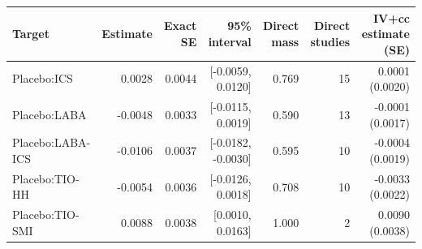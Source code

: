 \begin{tabular}{lrrrrrr}
\toprule
Target & Estimate & Exact SE & 95\% interval & Direct mass & Direct studies & IV+cc estimate (SE) \\
\midrule
Placebo:ICS & 0.0028 & 0.0044 & [-0.0059, 0.0120] & 0.769 & 15 & 0.0001 (0.0020) \\
Placebo:LABA & -0.0048 & 0.0033 & [-0.0115, 0.0019] & 0.590 & 13 & -0.0001 (0.0017) \\
Placebo:LABA-ICS & -0.0106 & 0.0037 & [-0.0182, -0.0030] & 0.595 & 10 & -0.0004 (0.0019) \\
Placebo:TIO-HH & -0.0054 & 0.0036 & [-0.0126, 0.0018] & 0.708 & 10 & -0.0033 (0.0022) \\
Placebo:TIO-SMI & 0.0088 & 0.0038 & [0.0010, 0.0163] & 1.000 & 2 & 0.0090 (0.0038) \\
\bottomrule
\end{tabular}
